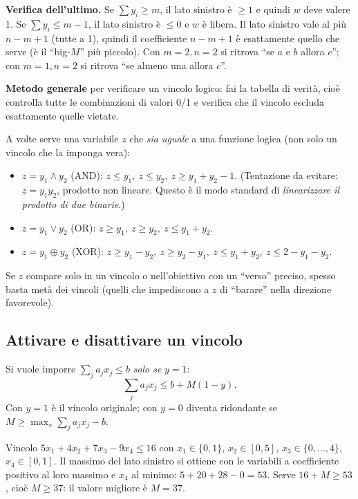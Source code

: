 \textbf{Verifica dell'ultimo.} Se $\sum y_i\ge m$, il lato sinistro è $\ge1$ e quindi $w$ deve valere 1. Se $\sum y_i\le m-1$, il lato sinistro è $\le0$ e $w$ è libera. Il lato sinistro vale al più $n-m+1$ (tutte a 1), quindi il coefficiente $n-m+1$ è esattamente quello che serve (è il ``big-$M$'' più piccolo). Con $m=2,n=2$ si ritrova ``se $a$ e $b$ allora $c$''; con $m=1,n=2$ si ritrova ``se almeno una allora $c$''.

\textbf{Metodo generale} per verificare un vincolo logico: fai la tabella di verità, cioè controlla tutte le combinazioni di valori 0/1 e verifica che il vincolo escluda esattamente quelle vietate.

\begin{extra}
A volte serve una variabile $z$ che \emph{sia uguale} a una funzione logica (non solo un vincolo che la imponga vera):
\begin{itemize}[nosep]
\item $z=y_1\land y_2$ (AND): $z\le y_1,\ z\le y_2,\ z\ge y_1+y_2-1$. (Tentazione da evitare: $z=y_1y_2$, prodotto non lineare. Questo è il modo standard di \emph{linearizzare il prodotto di due binarie}.)
\item $z=y_1\lor y_2$ (OR): $z\ge y_1,\ z\ge y_2,\ z\le y_1+y_2$.
\item $z=y_1\oplus y_2$ (XOR): $z\ge y_1-y_2,\ z\ge y_2-y_1,\ z\le y_1+y_2,\ z\le 2-y_1-y_2$.
\end{itemize}
Se $z$ compare solo in un vincolo o nell'obiettivo con un ``verso'' preciso, spesso basta metà dei vincoli (quelli che impediscono a $z$ di ``barare'' nella direzione favorevole).
\end{extra}

\subsection{Attivare e disattivare un vincolo}

Si vuole imporre $\sum_j a_jx_j\le b$ \emph{solo se} $y=1$:
\[ \sum_j a_jx_j\le b+M(1-y). \]
Con $y=1$ è il vincolo originale; con $y=0$ diventa ridondante se $M\ge \max_x\sum_ja_jx_j-b$.

\begin{esbox}[calcolo di $M$]
Vincolo $5x_1+4x_2+7x_3-9x_4\le16$ con $x_1\in\{0,1\}$, $x_2\in[0,5]$, $x_3\in\{0,\dots,4\}$, $x_4\in[0,1]$. Il massimo del lato sinistro si ottiene con le variabili a coefficiente positivo al loro massimo e $x_4$ al minimo: $5+20+28-0=53$. Serve $16+M\ge53$, cioè $M\ge 37$: il valore migliore è $M=37$.
\end{esbox}


